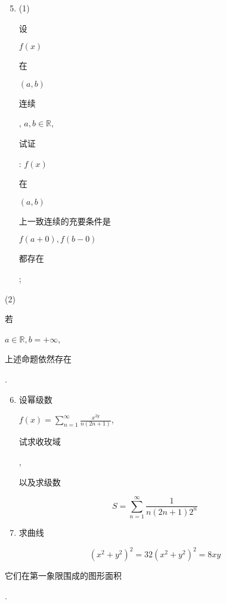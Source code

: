 \documentclass[10pt]{article}
\begin{document}
\begin{enumerate}
  \setcounter{enumi}{4}
  \item (1) \begin{CJK}{UTF8}{mj}设\end{CJK} $f(x)$ \begin{CJK}{UTF8}{mj}在\end{CJK} $(a, b)$ \begin{CJK}{UTF8}{mj}连续\end{CJK}, $a, b \in \mathbb{R}$, \begin{CJK}{UTF8}{mj}试证\end{CJK}: $f(x)$ \begin{CJK}{UTF8}{mj}在\end{CJK} $(a, b)$ \begin{CJK}{UTF8}{mj}上一致连续的充要条件是\end{CJK} $f(a+0), f(b-0)$ \begin{CJK}{UTF8}{mj}都存在\end{CJK};
\end{enumerate}
(2) \begin{CJK}{UTF8}{mj}若\end{CJK} $a \in \mathbb{R}, b=+\infty$, \begin{CJK}{UTF8}{mj}上述命题依然存在\end{CJK}.

\begin{enumerate}
  \setcounter{enumi}{5}
  \item \begin{CJK}{UTF8}{mj}设幂级数\end{CJK} $f(x)=\sum_{n=1}^{\infty} \frac{x^{2 y}}{n(2 n+1)}$, \begin{CJK}{UTF8}{mj}试求收玫域\end{CJK}, \begin{CJK}{UTF8}{mj}以及求级数\end{CJK}
\end{enumerate}
$$
S=\sum_{n=1}^{\infty} \frac{1}{n(2 n+1) 2^{n}}
$$

\begin{enumerate}
  \setcounter{enumi}{6}
  \item \begin{CJK}{UTF8}{mj}求曲线\end{CJK}
\end{enumerate}
$$
\left(x^{2}+y^{2}\right)^{2}=32\left(x^{2}+y^{2}\right)^{2}=8 x y
$$
\begin{CJK}{UTF8}{mj}它们在第一象限围成的图形面积\end{CJK}.
\end{document}
